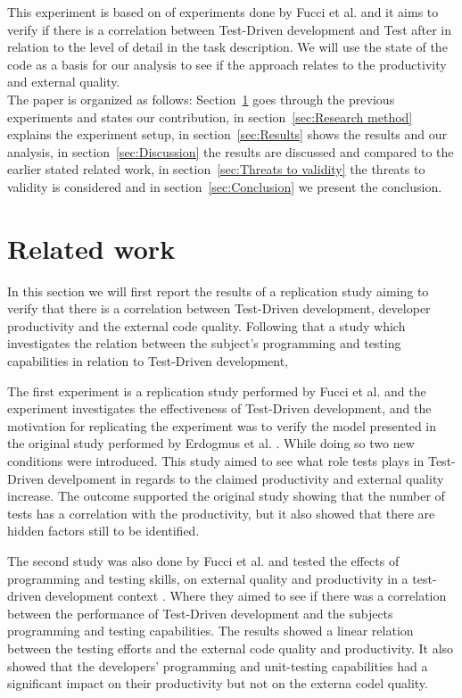 \documentclass{sig-alternate-05-2015}
\begin{document}
This experiment is based on of experiments done by Fucci et al. \cite{fucci2} and it aims to verify if there is a correlation between Test-Driven development and Test after in relation to the level of detail in the task description. We will use the state of the code as a basis for our analysis to see if the approach relates to the productivity and external quality.\\

The paper is organized as follows: Section~\ref{sec:Related work} goes through the previous experiments and states our contribution, in section~\ref{sec:Research method} explains the experiment setup, in section~\ref{sec:Results} shows the results and our analysis, in section~\ref{sec:Discussion} the results are discussed and compared to the earlier stated related work, in section~\ref{sec:Threats to validity} the threats to validity is considered and in section~\ref{sec:Conclusion} we present the conclusion. 

\section{Related work}
\label{sec:Related work}
In this section we will first report the results of a replication study aiming to verify that there is a correlation between Test-Driven development, developer productivity and the external code quality. Following that a study which investigates the relation between the subject's programming and testing capabilities in relation to Test-Driven development,

The first experiment is a replication study performed by  Fucci et al. \cite{fucci2} and the experiment investigates the effectiveness of Test-Driven development, and the motivation for replicating the experiment was to verify the model presented in the original study performed by Erdogmus et al. \cite{erdogmus1}. While doing so two new conditions were introduced. This study aimed to see what role tests plays in Test-Driven develpoment in regards to the claimed productivity and external quality increase. The outcome supported the original study showing that the number of tests has a correlation with the productivity, but it also showed that there are hidden factors still to be identified.

The second study was also done by Fucci et al. and tested the effects of programming and testing skills, on external quality and productivity in a test-driven development context \cite{fucci1}. Where they aimed to see if there was a correlation between the performance of Test-Driven development and the subjects programming and testing capabilities. The results showed a linear relation between the testing efforts and the external code quality and productivity. It also showed that the developers' programming and unit-testing capabilities had a significant impact on their productivity but not on the externa codel quality.
\end{document}
